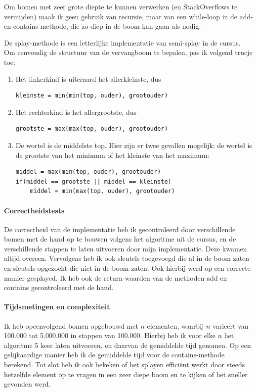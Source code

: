 \documentclass[titlepage,a4paper]{article}
\begin{document}
Om bomen met zeer grote diepte te kunnen verwerken (en StackOverflows te vermijden) maak ik geen gebruik van recursie, maar van een while-loop in de add- en contains-methode, die zo diep in de boom kan gaan als nodig.

De splay-methode is een letterlijke implementatie van semi-splay in de cursus. Om eenvoudig de structuur van de vervangboom te bepalen, pas ik volgend trucje toe:

\begin{enumerate}
\item Het linkerkind is uiteraard het allerkleinste, dus \begin{verbatim}kleinste = min(min(top, ouder), grootouder)\end{verbatim}
\item Het rechterkind is het allergrootste, dus \begin{verbatim}grootste = max(max(top, ouder), grootouder)\end{verbatim}
\item De wortel is de middelste top. Hier zijn er twee gevallen mogelijk: de wortel is de grootste van het minimum of het kleinste van het maximum: \begin{verbatim}middel = max(min(top, ouder), grootouder)
if(middel == grootste || middel == kleinste)
    middel = min(max(top, ouder), grootouder)\end{verbatim}
\end{enumerate}

\paragraph{Correctheidstests}
De correctheid van de implementatie heb ik gecontroleerd door verschillende bomen met de hand op te bouwen volgens het algoritme uit de cursus, en de verschillende stappen te laten uitvoeren door mijn implementatie. Deze kwamen altijd overeen. Vervolgens heb ik ook sleutels toegevoegd die al in de boom zaten en sleutels opgezocht die niet in de boom zaten. Ook hierbij werd op een correcte manier gesplayed. Ik heb ook de return-waarden van de methoden add en contains gecontroleerd met de hand.

\paragraph{Tijdsmetingen en complexiteit}
Ik heb opeenvolgend bomen opgebouwd met $n$ elementen, waarbij $n$ varieert van 100.000 tot 5.000.000 in stappen van 100.000. Hierbij heb ik voor elke $n$ het algoritme 5 keer laten uitvoeren, en daarvan de gemiddelde tijd genomen.
Op een gelijkaardige manier heb ik de gemiddelde tijd voor de contains-methode berekend.
Tot slot heb ik ook bekeken of het splayen effici\"ent werkt door steeds hetzelfde element op te vragen in een zeer diepe boom en te kijken of het sneller gevonden werd.
\end{document}
